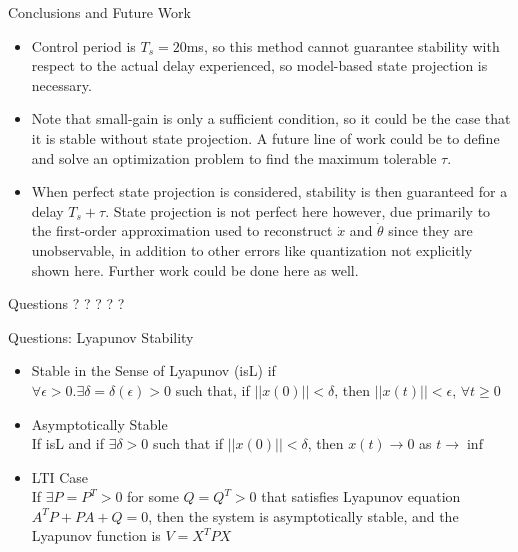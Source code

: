 \documentclass{beamer}
\begin{document}
\begin{frame}{Conclusions and Future Work}

\begin{itemize}
\pause \item Control period is $T_s=20$ms, so this method cannot guarantee stability with respect to the actual delay experienced, so model-based state projection is necessary.
\pause \item Note that small-gain is only a sufficient condition, so it could be the case that it is stable without state projection.  A future line of work could be to define and solve an optimization problem to find the maximum tolerable $\tau$.
\pause \item When perfect state projection is considered, stability is then guaranteed for a delay $T_s+\tau$.  State projection is not perfect here however, due primarily to the first-order approximation used to reconstruct $\dot{x}$ and $\dot{\theta}$ since they are unobservable, in addition to other errors like quantization not explicitly shown here.  Further work could be done here as well.
\end{itemize}

\end{frame}

\begin{frame}{Questions}
\small ? \Large ? \Huge ? \Giant ? \CrazyBig ?
\end{frame}

\begin{frame}{Questions: Lyapunov Stability}

\begin{itemize}
\pause \item Stable in the Sense of Lyapunov (isL) if\\
$\forall \epsilon>0 .\exists \delta=\delta\left(\epsilon\right)>0$ such that, if $||x\left(0\right)||<\delta$, then $||x\left(t\right)||<\epsilon$, $\forall t\geq0$
\pause \item Asymptotically Stable\\If isL and if $\exists \delta > 0$ such that if $||x\left(0\right)||<\delta$, then $x(t)\rightarrow0$ as $t\rightarrow\inf$
\pause \item LTI Case\\If $\exists P=P^T>0$ for some $Q=Q^T>0$ that satisfies Lyapunov equation $A^TP+PA+Q=0$, then the system is asymptotically stable, and the Lyapunov function is $V=X^TPX$
\end{itemize}

\end{frame}
\end{document}
